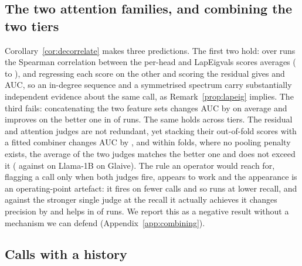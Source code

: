 \subsection{The two attention families, and combining the two tiers}
\label{sec:exp:decorrelate}
\label{sec:exp:agreement}

Corollary~\ref{cor:decorrelate} makes three predictions. The first two hold: over \decorrNRuns{} runs the
Spearman correlation between the per-head and LapEigvals scores averages \decorrRhoMean{}
(\decorrRhoMin{} to \decorrRhoMax{}), and regressing each score on the other and scoring the residual gives
\decorrResidPerHead{} and \decorrResidLapEig{} AUC, so an in-degree sequence and a symmetrised spectrum carry
substantially independent evidence about the same call, as Remark~\ref{prop:lapeig} implies. The third
fails: concatenating the two feature sets changes AUC by \decorrUnionGain{} on average and improves on the
better one in \decorrUnionPositiveRuns{} of \decorrNRuns{} runs. The same holds across tiers. The residual
and attention judges are not redundant, yet stacking their out-of-fold scores with a fitted combiner changes
AUC by \agrStackGain{}, and within folds, where no pooling penalty exists, the average of the two judges
matches the better one and does not exceed it (\poolWithinMeanLlamaOneBGlaive{} against
\poolWithinPerHeadLlamaOneBGlaive{} on Llama-1B on Glaive). The rule an operator would reach for, flagging a
call only when both judges fire, appears to work and the appearance is an operating-point artefact: it fires
on fewer calls and so runs at lower recall, and against the stronger single judge at the recall it actually
achieves it changes precision by \agrMatchedGain{} and helps in \agrMatchedPositive{} of \agrNRuns{} runs. We
report this as a negative result without a mechanism we can defend (Appendix~\ref{app:combining}).

\subsection{Calls with a history}
\label{sec:exp:multiturn}

